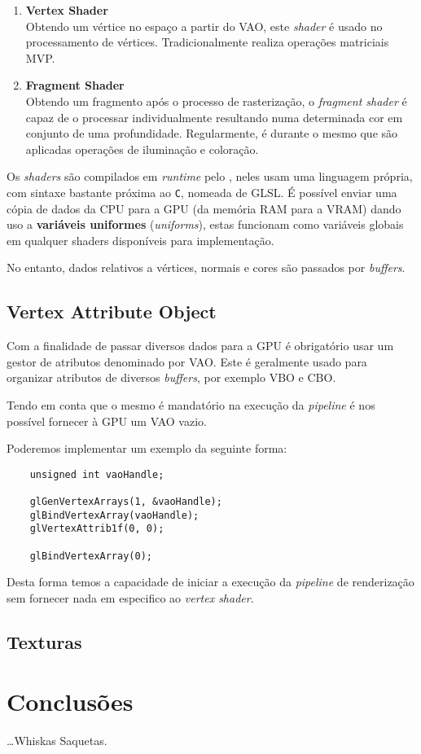 \begin{enumerate}
    \item \textbf{Vertex Shader}\\
    Obtendo um vértice no espaço a partir do \ac{VAO}, este \textit{shader} é usado no processamento de vértices. Tradicionalmente realiza operações matriciais \ac{MVP}.
    
    \item \textbf{Fragment Shader}\\
    Obtendo um fragmento após o processo de rasterização, o \textit{fragment shader} é capaz de o processar individualmente resultando numa determinada cor em conjunto de uma profundidade. Regularmente, é durante o mesmo que são aplicadas operações de iluminação e coloração.
\end{enumerate}

Os \textit{shaders} são compilados em \textit{runtime} pelo \opengl, neles usam uma linguagem própria, com sintaxe bastante próxima ao \verb*|C|, nomeada de \ac{GLSL}.
É possível enviar uma cópia de dados da \ac{CPU} para a \ac{GPU} (da memória \ac{RAM} para a \ac{VRAM}) dando uso a \textbf{variáveis uniformes} (\textit{uniforms}), estas funcionam como variáveis globais em qualquer shaders disponíveis para implementação.

No entanto, dados relativos a vértices, normais e cores são passados por \textit{buffers}.

\subsection{Vertex Attribute Object}
Com a finalidade de passar diversos dados para a \ac{GPU} é obrigatório usar um gestor de atributos denominado por \acf{VAO}. Este é geralmente usado para organizar atributos de diversos \textit{buffers}, por exemplo \ac{VBO} e \ac{CBO}.

Tendo em conta que o mesmo é mandatório na execução da \textit{pipeline} é nos possível fornecer à \ac{GPU} um \ac{VAO} vazio.

Poderemos implementar um exemplo da seguinte forma:

\begin{verbatim}
    unsigned int vaoHandle;

    glGenVertexArrays(1, &vaoHandle);
    glBindVertexArray(vaoHandle);
    glVertexAttrib1f(0, 0);

    glBindVertexArray(0);
\end{verbatim}

Desta forma temos a capacidade de iniciar a execução da \textit{pipeline} de renderização sem fornecer nada em especifico ao \textit{vertex shader}.

\subsection{Texturas}


\section{Conclusões}
\label{sec::arte:conc}

\ldots Whiskas Saquetas.
